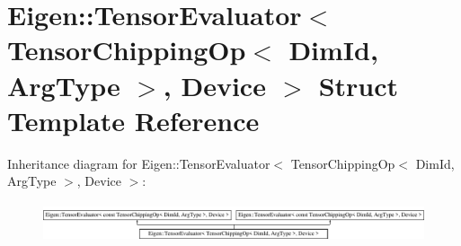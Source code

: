 \hypertarget{struct_eigen_1_1_tensor_evaluator_3_01_tensor_chipping_op_3_01_dim_id_00_01_arg_type_01_4_00_01_device_01_4}{}\section{Eigen\+:\+:Tensor\+Evaluator$<$ Tensor\+Chipping\+Op$<$ Dim\+Id, Arg\+Type $>$, Device $>$ Struct Template Reference}
\label{struct_eigen_1_1_tensor_evaluator_3_01_tensor_chipping_op_3_01_dim_id_00_01_arg_type_01_4_00_01_device_01_4}
Inheritance diagram for Eigen\+:\+:Tensor\+Evaluator$<$ Tensor\+Chipping\+Op$<$ Dim\+Id, Arg\+Type $>$, Device $>$\+:\begin{figure}[H]
\begin{center}
\leavevmode
\includegraphics[height=1.171548cm]{struct_eigen_1_1_tensor_evaluator_3_01_tensor_chipping_op_3_01_dim_id_00_01_arg_type_01_4_00_01_device_01_4}
\end{center}
\end{figure}
